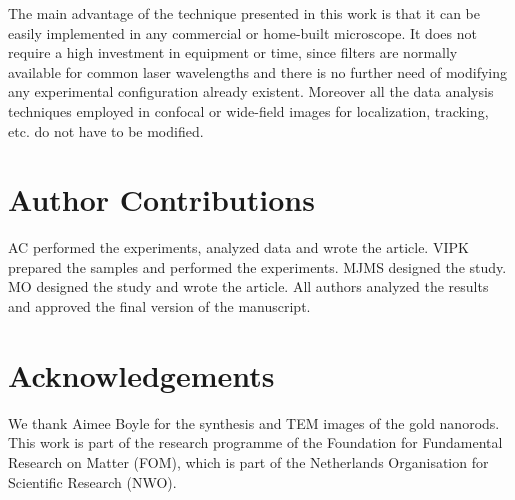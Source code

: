 \documentclass[journal=nalefd,manuscript=letter]{achemso}
\begin{document}
The main advantage of the technique presented in this work is that it can be
easily implemented in any commercial or home-built microscope. It does not
require a high investment in equipment or time, since filters are normally
available for common laser wavelengths and there is no further need of modifying
any experimental configuration already existent. Moreover all the data analysis
techniques employed in confocal or wide-field images for localization, tracking,
etc. do not have to be modified.

\section{Author Contributions}
AC performed the experiments, analyzed data and wrote the article. VIPK
prepared the samples and performed the experiments. MJMS designed the study. MO
designed the study and wrote the article. All authors analyzed the results and
approved the final version of the manuscript.

\section{Acknowledgements}
We thank Aimee Boyle for the synthesis and TEM images of the gold nanorods.
This work is part of the research programme of the Foundation for Fundamental
Research on Matter (FOM), which is part of the Netherlands Organisation for
Scientific Research (NWO).


\end{document}
